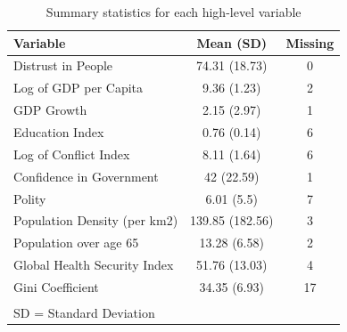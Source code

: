 \documentclass[
  11pt,
]{article}
\begin{document}
\begin{table}

\caption{\label{tab:stats}Summary statistics for each high-level variable}
\centering
\begin{tabular}[t]{lcc}
\toprule
Variable & Mean (SD) & Missing\\
\midrule
Distrust in People & 74.31 (18.73) & 0\\
Log of GDP per Capita & 9.36 (1.23) & 2\\
GDP Growth & 2.15 (2.97) & 1\\
Education Index & 0.76 (0.14) & 6\\
Log of Conflict Index & 8.11 (1.64) & 6\\
\addlinespace
Confidence in Government & 42 (22.59) & 1\\
Polity & 6.01 (5.5) & 7\\
Population Density (per km2) & 139.85 (182.56) & 3\\
Population over age 65 & 13.28 (6.58) & 2\\
Global Health Security Index & 51.76 (13.03) & 4\\
\addlinespace
Gini Coefficient & 34.35 (6.93) & 17\\
\bottomrule
\multicolumn{3}{l}{\textsuperscript{} \small{SD = Standard Deviation}}\\
\end{tabular}
\end{table}
\end{document}
